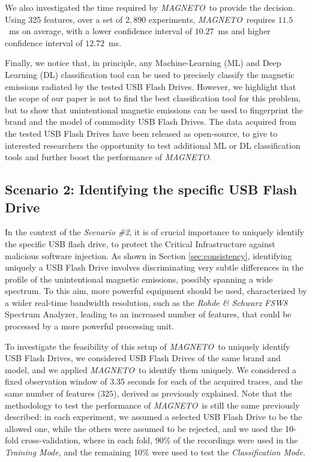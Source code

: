 \documentclass[acmsmall, authorversion]{acmart}
\newcommand{\sol}{\emph{MAGNETO}}
\begin{document}
We also investigated the time required by \sol\ to provide the decision. Using 325 features, over a set of $2,890$ experiments, \sol\ requires $11.5$~ms on average, with a lower confidence interval of $10.27$~ms and higher confidence interval of $12.72$~ms.

Finally, we notice that, in principle, any Machine-Learning (ML) and Deep Learning (DL) classification tool can be used to precisely classify the magnetic emissions radiated by the tested USB Flash Drives. However, we highlight that the scope of our paper is not to find the best classification tool for this problem, but to show that unintentional magnetic emissions can be used to fingerprint the brand and the model of commodity USB Flash Drives. The data acquired from the tested USB Flash Drives have been released as open-source, to give to interested researchers the opportunity to test additional ML or DL classification tools and further boost the performance of \sol \cite{crilab}.

\subsection{Scenario 2: Identifying the specific USB Flash Drive}
\label{sec:auth}

In the context of the \emph{Scenario \#2}, it is of crucial importance to uniquely identify the specific USB flash drive, to protect the Critical Infrastructure against malicious software injection. As shown in Section \ref{sec:consistency}, identifying uniquely a USB Flash Drive involves discriminating very subtle differences in the profile of the unintentional magnetic emissions, possibly spanning a wide spectrum. To this aim, more powerful equipment should be used, characterized by a wider real-time bandwidth resolution, such as the \emph{Rohde \& Schwarz FSW8} Spectrum Analyzer, leading to an increased number of features, that could be processed by a more powerful processing unit.

To investigate the feasibility of this setup of \sol\ to uniquely identify USB Flash Drives, we considered USB Flash Drives of the same brand and model, and we applied \sol\ to identify them uniquely. 
We considered a fixed observation window of 3.35 seconds for each of the acquired traces, and the same number of features ($325$), derived as previously explained.
Note that the methodology to test the performance of \sol\ is still the same previously described: in each experiment, we assumed a selected USB Flash Drive to be the allowed one, while the others were assumed to be rejected, and we used the 10-fold cross-validation, where in each fold, 90\% of the recordings were used in the \emph{Training Mode}, and the remaining 10\% were used to test the \emph{Classification Mode}.
\end{document}
